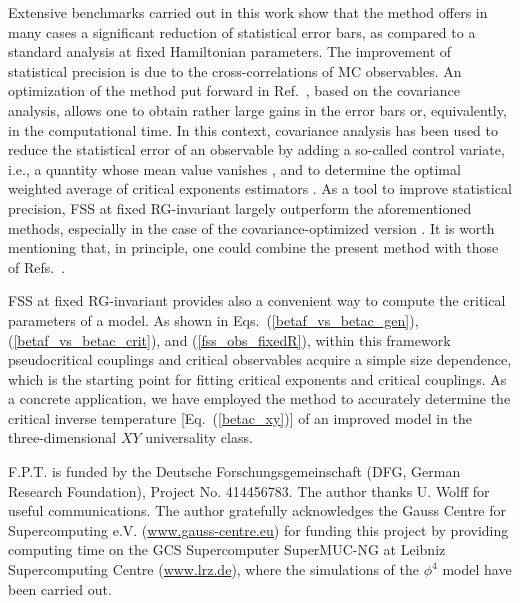 \documentclass[pre,twocolumn]{revtex4-2}
\begin{document}
Extensive benchmarks carried out in this work show that the method offers in many cases a significant reduction of statistical error bars, as compared to a standard analysis at fixed Hamiltonian parameters.
The improvement of statistical precision is due to the cross-correlations of MC observables.
An optimization of the method put forward in Ref.~\cite{PT-11}, based on the covariance analysis, allows one to obtain rather large gains in the error bars or, equivalently, in the computational time.
In this context,
covariance analysis has been used to
reduce the statistical error of an observable
by adding a so-called control variate, i.e., a quantity whose mean value vanishes \cite{FMM-09}, and to
determine
the optimal weighted average of critical exponents estimators \cite{WJ-09,WJ-10}.
As a tool to improve statistical precision, FSS at fixed RG-invariant largely outperform the aforementioned methods, especially in the case of the covariance-optimized version \cite{PT-11}.
It is worth mentioning that, in principle, one could combine the present method with those of Refs.~\cite{FMM-09,WJ-09,WJ-10}.

FSS at fixed RG-invariant provides also a convenient way to compute the critical parameters of a model.
As shown in Eqs.~(\ref{betaf_vs_betac_gen}), (\ref{betaf_vs_betac_crit}), and (\ref{fss_obs_fixedR}), within this framework pseudocritical couplings and critical observables acquire a simple size dependence, which is the starting point for fitting critical exponents and critical couplings.
As a concrete application,
we have employed the method to accurately determine the critical inverse temperature [Eq.~(\ref{betac_xy})] of an improved model in the three-dimensional $XY$ universality class.

\begin{acknowledgments}
  F.P.T. is funded by the Deutsche Forschungsgemeinschaft (DFG, German Research Foundation), Project No. 414456783.
  The author thanks U. Wolff for useful communications.
  The author gratefully acknowledges the Gauss Centre for Supercomputing e.V. (\href{www.gauss-centre.eu}{www.gauss-centre.eu}) for funding this project by providing computing time on the GCS Supercomputer SuperMUC-NG at Leibniz Supercomputing Centre (\href{www.lrz.de}{www.lrz.de}), where the simulations of the $\phi^4$ model have been carried out.
\end{acknowledgments}



\appendix
\end{document}
